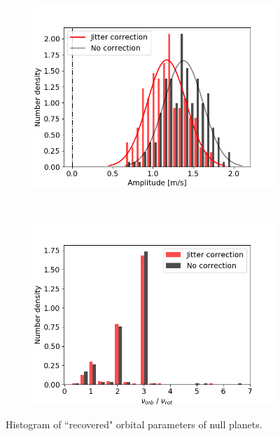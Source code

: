 \begin{figure}[htbp]	
    \begin{subfigure}[b]{0.49\textwidth}
        \includegraphics[width=\textwidth]{./Figures/Methods/Histogram_new1_null.png}
    \end{subfigure}
	~
    \begin{subfigure}[b]{0.49\textwidth}
        \includegraphics[width=\textwidth]{./Figures/Methods/Histogram_new2_null.png}
    \end{subfigure}	
    \caption[Histogram of recovered orbital parameters of null planets]
    {Histogram of ``recovered" orbital parameters of null planets.}
\label{fig:Histogram_null}
\end{figure}    

